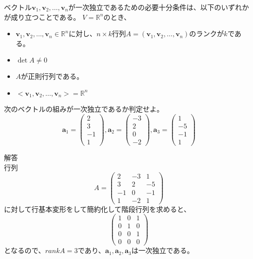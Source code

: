 \documentclass{jlreq}
\begin{document}
\begin{theorembox}[一次独立と同値な条件]
  ベクトル$\boldsymbol{v}_1, \boldsymbol{v}_2, \ldots, \boldsymbol{v}_n$が一次独立であるための必要十分条件は、以下のいずれかが成り立つことである。
  $V= \mathbb{R}^n$のとき、

  \begin{itemize}
    \item $\boldsymbol{v}_1, \boldsymbol{v}_2, \ldots, \boldsymbol{v}_n \in \mathbb{R}^n$に対し、$n \times k$行列$A = (\boldsymbol{v}_1, \boldsymbol{v}_2, \ldots, \boldsymbol{v}_n)$のランクが$k$である。
    \item $\det A \neq 0$
    \item $A$が正則行列である。
    \item $<\boldsymbol{v}_1, \boldsymbol{v}_2, \ldots, \boldsymbol{v}_n> = \mathbb{R}^n$
  \end{itemize}
\end{theorembox}
\begin{problem}
  次のベクトルの組みが一次独立であるか判定せよ。
  \begin{equation*}
    \boldsymbol{a}_1 = \begin{pmatrix} 2 \\ 3 \\ -1  \\ 1 \end{pmatrix}, \boldsymbol{a}_2 = \begin{pmatrix} -3 \\ 2 \\ 0 \\ -2 \end{pmatrix}, \boldsymbol{a}_3 = \begin{pmatrix} 1 \\ -5 \\ -1 \\ 1 \end{pmatrix}
  \end{equation*}

  \dotfill

  解答 \\
  行列
  \begin{equation*}
    A = \begin{pmatrix}
      2 & -3 & 1 \\
      3 & 2 & -5 \\
      -1 & 0 & -1 \\
      1 & -2 & 1
    \end{pmatrix}
  \end{equation*}
  に対して行基本変形をして簡約化して階段行列を求めると、
  \begin{equation*}
    \begin{pmatrix}
      1 & 0 & 1 \\
      0 & 1 & 0 \\
      0 & 0 & 1 \\
      0 & 0 & 0
    \end{pmatrix}
  \end{equation*}
  となるので、$rank A = 3$であり、$\boldsymbol{a}_1, \boldsymbol{a}_2, \boldsymbol{a}_3$は一次独立である。
\end{problem}
\end{document}
